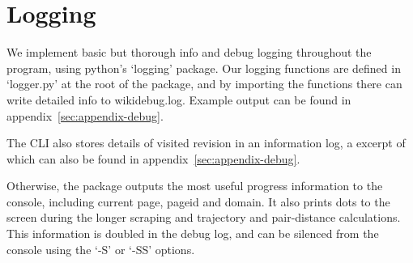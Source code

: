 \section{Logging}
We implement basic but thorough info and debug logging throughout the
program, using python's `logging' package. Our logging functions are
defined in `logger.py' at the root of the package, and by importing
the functions there can write detailed info to wikidebug.log. Example
output can be found in appendix~\ref{sec:appendix-debug}.

The CLI also stores details of visited revision in an information log,
a excerpt of which can also be found in appendix~\ref{sec:appendix-debug}.

Otherwise, the package outputs the most useful progress information to
the console, including current page, pageid and domain. It also prints
dots to the screen during the longer scraping and trajectory and
pair-distance calculations. This information is doubled in the debug
log, and can be silenced from the console using the `-S' or `-SS'
options.
